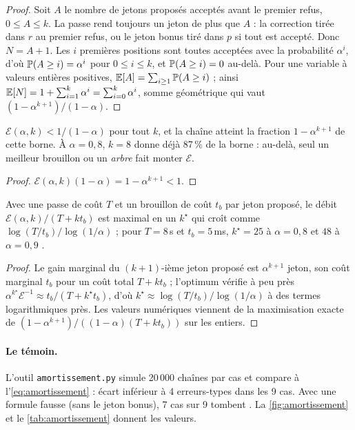 \begin{proof}
Soit $A$ le nombre de jetons proposés acceptés avant le premier refus, $0 \le A \le k$. La passe rend toujours un jeton de plus que $A$ : la correction tirée dans $r$ au premier refus, ou le jeton bonus tiré dans $p$ si tout est accepté. Donc $N = A + 1$. Les $i$ premières positions sont toutes acceptées avec la probabilité $\alpha^i$, d'où $\mathbb{P}(A \ge i) = \alpha^i$ pour $0 \le i \le k$, et $\mathbb{P}(A \ge i) = 0$ au-delà. Pour une variable à valeurs entières positives, $\mathbb{E}[A] = \sum_{i \ge 1} \mathbb{P}(A \ge i)$ ; ainsi $\mathbb{E}[N] = 1 + \sum_{i=1}^{k} \alpha^i = \sum_{i=0}^{k} \alpha^i$, somme géométrique qui vaut $(1 - \alpha^{k+1})/(1-\alpha)$.
\end{proof}

\begin{corollaire}\label{cor:borne-chaine}
$\mathcal E(\alpha, k) < 1/(1 - \alpha)$ pour tout $k$, et la chaîne atteint la fraction $1 - \alpha^{k+1}$ de cette borne. À $\alpha = 0{,}8$, $k = 8$ donne déjà 87\,\% de la borne : au-delà, seul un meilleur brouillon ou un \emph{arbre} fait monter $\mathcal E$.
\end{corollaire}

\begin{proof}
$\mathcal E(\alpha,k) (1-\alpha) = 1 - \alpha^{k+1} < 1$.
\end{proof}

\begin{corollaire}\label{cor:k-optimal}
Avec une passe de coût $T$ et un brouillon de coût $t_b$ par jeton proposé, le débit $\mathcal E(\alpha,k)/(T + k t_b)$ est maximal en un $k^\star$ qui croît comme $\log(T/t_b)/\log(1/\alpha)$ ; pour $T = 8$\,s et $t_b = 5$\,ms, $k^\star = 25$ à $\alpha = 0{,}8$ et $48$ à $\alpha = 0{,}9$ \calc.
\end{corollaire}

\begin{proof}
Le gain marginal du $(k{+}1)$-ième jeton proposé est $\alpha^{k+1}$ jeton, son coût marginal $t_b$ pour un coût total $T + kt_b$ ; l'optimum vérifie à peu près $\alpha^{k^\star} \mathcal E^{-1} \approx t_b/(T + k^\star t_b)$, d'où $k^\star \approx \log(T/t_b)/\log(1/\alpha)$ à des termes logarithmiques près. Les valeurs numériques viennent de la maximisation exacte de $(1-\alpha^{k+1})/((1-\alpha)(T + kt_b))$ sur les entiers.
\end{proof}

\paragraph{Le témoin.} L'outil \texttt{amortissement.py} simule 20\,000 chaînes par cas et compare à l'\cref{eq:amortissement} : écart inférieur à 4 erreurs-types dans les 9 cas. Avec une formule fausse (sans le jeton bonus), 7 cas sur 9 tombent \mes. La \cref{fig:amortissement} et le \cref{tab:amortissement} donnent les valeurs.

